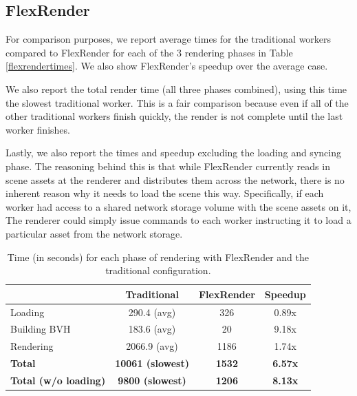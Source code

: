 \documentclass[12pt]{ucthesis}
\begin{document}
\subsection{FlexRender}
\label{toystoreflexrender}

For comparison purposes, we report average times for the traditional workers
compared to FlexRender for each of the 3 rendering phases in Table
\ref{flexrendertimes}. We also show FlexRender's speedup over the average case.

We also report the total render time (all three phases combined), using this
time the slowest traditional worker. This is a fair comparison because even if
all of the other traditional workers finish quickly, the render is not complete
until the last worker finishes.

Lastly, we also report the times and speedup excluding the loading and syncing
phase. The reasoning behind this is that while FlexRender currently reads in
scene assets at the renderer and distributes them across the network, there is
no inherent reason why it needs to load the scene this way. Specifically,
if each worker had access to a shared network storage volume with the scene
assets on it, The renderer could simply issue commands to each worker
instructing it to load a particular asset from the network storage.

\begin{table}
\begin{center}
\begin{tabular}{|l||c|c|c|}
    \hline
    & Traditional & FlexRender & Speedup \\
    \hline
    \hline
    Loading & 290.4 (avg) & 326 & 0.89x \\
    \hline
    Building BVH & 183.6 (avg) & 20 & 9.18x \\
    \hline
    Rendering & 2066.9 (avg) & 1186 & 1.74x \\
    \hline
    \hline
    \textbf{Total} & \textbf{10061 (slowest)} & \textbf{1532} & \textbf{6.57x} \\
    \hline
    \textbf{Total (w/o loading)} & \textbf{9800 (slowest)} & \textbf{1206} & \textbf{8.13x} \\
    \hline
\end{tabular}
\caption{Time (in seconds) for each phase of rendering with FlexRender and the traditional configuration.}
\label{tb:flexrendertimes}
\end{center}
\end{table}
\end{document}
